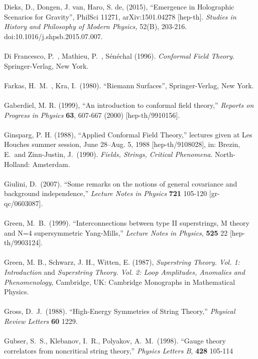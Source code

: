 \documentclass[12pt]{article}
\renewcommand{\^}[1]{\hat{#1}}
\begin{document}
Dieks, D., Dongen, J. van, Haro, S. de, (2015), ``Emergence in Holographic Scenarios for Gravity'', PhilSci 11271, arXiv:1501.04278 [hep-th]. {\it Studies in History and Philosophy of Modern Physics,} 52(B), 203-216. doi:10.1016/j.shpsb.2015.07.007.\\
\\
Di Francesco, P.~, Mathieu, P.~, S\'en\'echal (1996). {\it Conformal Field Theory}. Springer-Verlag, New York.\\
\\
Farkas, H.~M.~, Kra, I.~(1980). ``Riemann Surfaces'', Springer-Verlag, New York.\\
\\
Gaberdiel, M. R. (1999), ``An introduction to conformal field theory,'' {\it Reports on Progress in Physics} {\bf 63}, 607-667  (2000)
  [hep-th/9910156].\\
\\
Ginsparg, P. H. (1988), ``Applied Conformal Field Theory,''  lectures given at Les Houches summer session, June 28--Aug. 5, 1988 [hep-th/9108028], in: Brezin, E.~and Zinn-Justin, J.~(1990). {\it Fields, Strings, Critical Phenomena}. North-Holland: Amsterdam. \\
\\
Giulini, D.~(2007). ``Some remarks on the notions of general covariance and background independence,''  {\it Lecture Notes in Physics}  {\bf 721} 105-120
  [gr-qc/0603087].\\
\\
Green, M.~B.~(1999). ``Interconnections between type II superstrings, M theory and N=4 supersymmetric Yang-Mills,''
  {\it Lecture Notes in Physics}, {\bf 525} 22
  [hep-th/9903124].\\
\\
Green, M. B., Schwarz, J. H., Witten, E. (1987), {\it Superstring Theory. Vol. 1: Introduction} and {\it Superstring Theory. Vol. 2: Loop Amplitudes, Anomalies and Phenomenology,} Cambridge, UK: Cambridge Monographs in Mathematical Physics. \\
\\
 Gross,  D.~J.~(1988). ``High-Energy Symmetries of String Theory,''
  {\it Physical Review Letters}  {\bf 60}  1229.\\
\\
Gubser, S.~S., Klebanov, I.~R., Polyakov, A.~M.~(1998). ``Gauge theory correlators from noncritical string theory,''
{\it Physics Letters B}, {\bf 428} 105-114 
\end{document}
